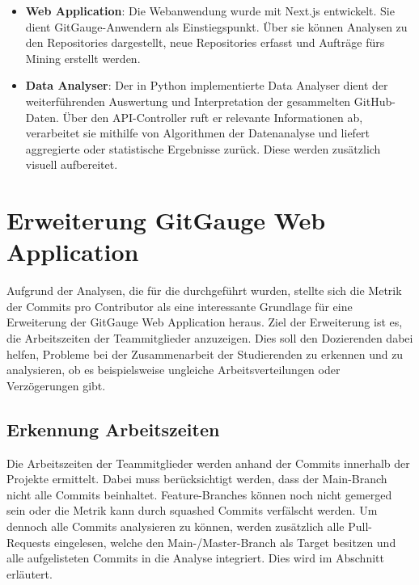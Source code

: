 \begin{itemize}
    \item \textbf{Web Application}: Die Webanwendung wurde mit Next.js entwickelt. Sie dient GitGauge-Anwendern als Einstiegspunkt. Über sie können Analysen zu den Repositories dargestellt, neue Repositories erfasst und Aufträge fürs Mining erstellt werden. 
    \item \textbf{Data Analyser}:  Der in Python implementierte Data Analyser dient der weiterführenden Auswertung und Interpretation der gesammelten GitHub-Daten. Über den API-Controller ruft er relevante Informationen ab, verarbeitet sie mithilfe von Algorithmen der Datenanalyse und liefert aggregierte oder statistische Ergebnisse zurück. Diese werden zusätzlich visuell aufbereitet.
\end{itemize}

\section{Erweiterung GitGauge Web Applica\-tion}
\label{sec:ErweiterungGitGaugeWeb}
Aufgrund der Analysen, die für die  durchgeführt wurden, stellte sich die Metrik der Commits pro Contributor als eine interessante Grundlage für eine Erweiterung der GitGauge Web Application heraus.  
Ziel der Erweiterung ist es, die Arbeitszeiten der Teammitglieder anzuzeigen. Dies soll den Dozierenden dabei helfen, Probleme bei der Zusammenarbeit der Studierenden zu erkennen und zu analysieren, ob es beispielsweise ungleiche Arbeitsverteilungen oder Verzögerungen gibt.

\subsection{Erkennung Arbeitszeiten}
Die Arbeitszeiten der Teammitglieder werden anhand der Commits innerhalb der Projekte ermittelt. Dabei muss berücksichtigt werden, dass der Main-Branch nicht alle Commits beinhaltet. Feature-Branches können noch nicht gemerged sein oder die Metrik kann durch squashed Commits verfälscht werden. Um dennoch alle Commits analysieren zu können, werden zusätzlich alle Pull-Requests eingelesen, welche den Main-/Master-Branch als Target besitzen und alle aufgelisteten Commits in die Analyse integriert. Dies wird im Abschnitt  erläutert.

